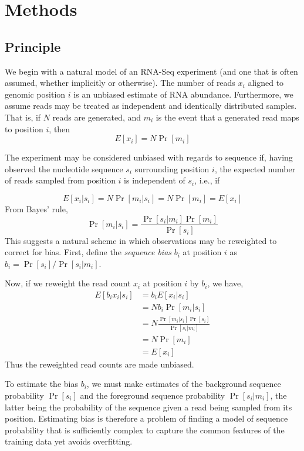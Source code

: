 \documentclass{bioinfo}
\begin{document}
\section{Methods}

\subsection{Principle}

We begin with a natural model of an RNA-Seq experiment (and one that is often
assumed, whether implicitly or otherwise). The number of reads $x_i$ aligned to
genomic position $i$ is an unbiased estimate of RNA abundance. Furthermore, we
assume reads may be treated as independent and identically distributed samples.
That is, if $N$ reads are generated, and $m_i$ is the event that a generated
read maps to position $i$, then
$$ E[x_i] = N \Pr[m_i] $$

The experiment may be considered unbiased  with regards to sequence if, having
observed the nucleotide sequence $s_i$ surrounding position $i$, the expected
number of reads sampled from position $i$ is independent of $s_i$, i.e., if

$$ E[ x_i | s_i ] = N \Pr[ m_i | s_i ] = N \Pr[ m_i ] = E[ x_i ] $$
From Bayes' rule,
$$ \Pr[ m_i | s_i ] = \frac{ \Pr[ s_i | m_i ] \Pr[ m_i ] }{ \Pr[ s_i ] } $$
This suggests a natural scheme in which observations may be reweighted to
correct for bias.  First, define the \emph{sequence bias} $b_i$ at position $i$
as $ b_i = \Pr[ s_i ] /  \Pr[ s_i | m_i ]  $.

Now, if we reweight the read count $x_i$ at position $i$ by $b_i$, we
have,
\begin{align*}
E[ b_i x_i | s_i ] &= b_i E[ x_i | s_i ] \\
&= N b_i \Pr[ m_i | s_i ] \\
&= N \frac{ \Pr[ m_i | s_i ] \Pr[ s_i ] }{ \Pr[ s_i | m_i ] } \\
&= N \Pr[ m_i ] \\
&= E[ x_i ]
\end{align*}
Thus the reweighted read counts are made unbiased.

To estimate the bias $b_i$, we must make estimates of the background sequence
probability $\Pr[s_i]$ and the foreground sequence probability $\Pr[ s_i | m_i
]$, the latter being the probability of the sequence given a read being sampled
from its position. Estimating bias is therefore a problem of finding a model of
sequence probability that is sufficiently complex to capture the common features
of the training data yet avoids overfitting.
\end{document}
